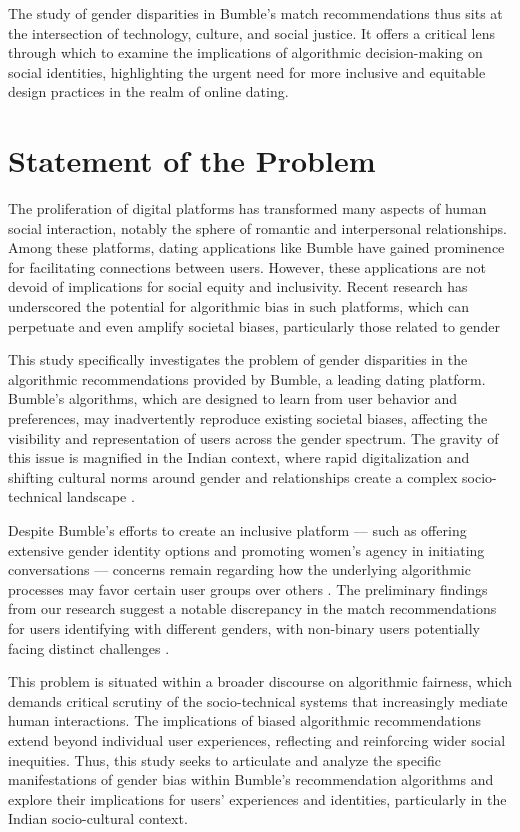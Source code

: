 The study of gender disparities in Bumble's match recommendations thus sits at the intersection of technology, culture, and social justice. It offers a critical lens through which to examine the implications of algorithmic decision-making on social identities, highlighting the urgent need for more inclusive and equitable design practices in the realm of online dating.

\section{Statement of the Problem}
The proliferation of digital platforms has transformed many aspects of human social interaction, notably the sphere of romantic and interpersonal relationships. Among these platforms, dating applications like Bumble have gained prominence for facilitating connections between users. However, these applications are not devoid of implications for social equity and inclusivity. Recent research has underscored the potential for algorithmic bias in such platforms, which can perpetuate and even amplify societal biases, particularly those related to gender \cite{Hutson_Taft_Barocas_Levy_2018, Lambrecht_Tucker_2019, Selbst_Boyd_Friedler_Venkatasubramanian_Vertesi_2019}

This study specifically investigates the problem of gender disparities in the algorithmic recommendations provided by Bumble, a leading dating platform. Bumble’s algorithms, which are designed to learn from user behavior and preferences, may inadvertently reproduce existing societal biases, affecting the visibility and representation of users across the gender spectrum. The gravity of this issue is magnified in the Indian context, where rapid digitalization and shifting cultural norms around gender and relationships create a complex socio-technical landscape \cite{Das_2019, Forbes_2020}.

Despite Bumble's efforts to create an inclusive platform — such as offering extensive gender identity options and promoting women's agency in initiating conversations — concerns remain regarding how the underlying algorithmic processes may favor certain user groups over others \cite{Bivens_Hoque_2018, MacLeod_McArthur_2019}. The preliminary findings from our research suggest a notable discrepancy in the match recommendations for users identifying with different genders, with non-binary users potentially facing distinct challenges \cite{Kalra_Gupta_Varghese_Rangaswamy_2023}.

This problem is situated within a broader discourse on algorithmic fairness, which demands critical scrutiny of the socio-technical systems that increasingly mediate human interactions. The implications of biased algorithmic recommendations extend beyond individual user experiences, reflecting and reinforcing wider social inequities. Thus, this study seeks to articulate and analyze the specific manifestations of gender bias within Bumble's recommendation algorithms and explore their implications for users’ experiences and identities, particularly in the Indian socio-cultural context.

